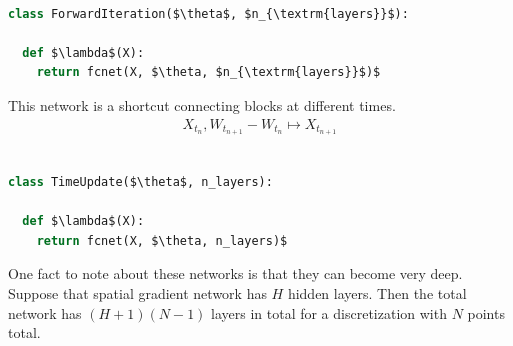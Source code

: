 \documentclass[book.tex]{subfiles}
\begin{document}
\begin{lstlisting}[language=python]

class ForwardIteration($\theta$, $n_{\textrm{layers}}$):

  def $\lambda$(X):
    return fcnet(X, $\theta, $n_{\textrm{layers}}$)$

\end{lstlisting}


This network is a shortcut connecting blocks at different times. 
\begin{align}
    X_{t_n}, W_{t_{n+1}} - W_{t_n} \mapsto X_{t_{n+1}}
\end{align}

\begin{lstlisting}[language=python]

class TimeUpdate($\theta$, n_layers):

  def $\lambda$(X):
    return fcnet(X, $\theta, n_layers)$

\end{lstlisting}

One fact to note about these networks is that they can become very deep. Suppose that spatial gradient network has $H$ hidden layers. Then the total network has $(H+1)(N-1)$ layers in total for a discretization with $N$ points total.




\end{document}
